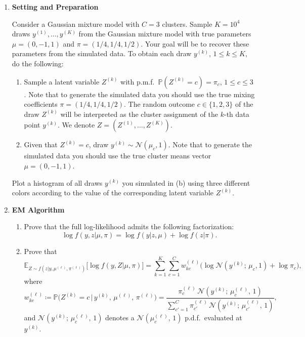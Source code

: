 \begin{enumerate}
\begin{enumerate}
  \item[\textbf{1.}] \textbf{Setting and Preparation}

  Consider a Gaussian mixture model with $C = 3$ clusters. Sample $K = 10^4$ draws
  $y^{(1)}, \ldots, y^{(K)}$ from the Gaussian mixture model with true parameters
  $\mu = (0, -1, 1)$ and $\pi = (1/4, 1/4, 1/2)$. Your goal will be to recover these parameters
  from the simulated data. To obtain each draw $y^{(k)}$, $1 \leq k \leq K$, do the following:

  \begin{enumerate}
    \item[\textit{a)}] Sample a latent variable $Z^{(k)}$ with p.m.f.\ $\mathbb{P}(Z^{(k)} = c) = \pi_c$,
          $1 \leq c \leq 3$. Note that to generate the simulated data you should use the true mixing
          coefficients $\pi = (1/4, 1/4, 1/2)$. The random outcome $c \in \{1, 2, 3\}$ of the draw
          $Z^{(k)}$ will be interpreted as the cluster assignment of the $k$-th data point $y^{(k)}$.
          We denote $Z = (Z^{(1)}, \ldots, Z^{(K)})$.
    \item[\textit{b)}] Given that $Z^{(k)} = c$, draw $y^{(k)} \sim \mathcal{N}(\mu_c, 1)$. Note
          that to generate the simulated data you should use the true cluster means vector
          $\mu = (0, -1, 1)$.
  \end{enumerate}

  Plot a histogram of all draws $y^{(k)}$ you simulated in (b) using three different colors
  according to the value of the corresponding latent variable $Z^{(k)}$.

  \item[\textbf{2.}] \textbf{EM Algorithm}

  \begin{enumerate}
    \item[\textit{c)}] Prove that the full log-likelihood admits the following factorization:
    \[
      \log f(y, z|\mu, \pi) = \log f(y|z, \mu) + \log f(z|\pi).
    \]

    \item[\textit{d)}] Prove that
    \[
      \mathbb{E}_{Z \sim f(z|y,\mu^{(\ell)},\pi^{(\ell)})}\!\bigl[\log f(y, Z|\mu, \pi)\bigr]
      = \sum_{k=1}^{K}\sum_{c=1}^{C} w_{kc}^{(\ell)}
        \bigl(\log \mathcal{N}(y^{(k)};\, \mu_c, 1) + \log \pi_c\bigr),
    \]
    where
    \[
      w_{kc}^{(\ell)} \coloneqq \mathbb{P}\!\bigl(Z^{(k)} = c\,|\,y^{(k)},\, \mu^{(\ell)},\, \pi^{(\ell)}\bigr)
      = \frac{\pi_c^{(\ell)}\,\mathcal{N}(y^{(k)};\,\mu_c^{(\ell)},\,1)}
             {\sum_{c'=1}^{C}\pi_{c'}^{(\ell)}\,\mathcal{N}(y^{(k)};\,\mu_{c'}^{(\ell)},\,1)},
    \]
    and $\mathcal{N}(y^{(k)};\,\mu_c^{(\ell)},\,1)$ denotes a $\mathcal{N}(\mu_c^{(\ell)},\,1)$
    p.d.f.\ evaluated at $y^{(k)}$.


\end{enumerate}
\end{enumerate}
\end{enumerate}
